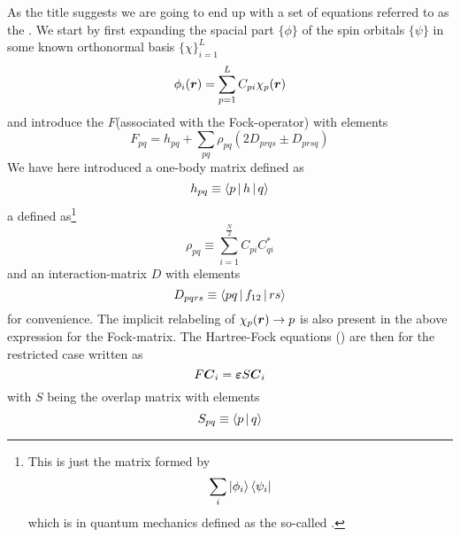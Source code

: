         As the title suggests we are going to end up with a set of equations
        referred to as the . We start by first
        expanding the spacial part $\{\phi\}$ of the spin orbitals $\{\psi\}$
        in some known orthonormal basis $\{\chi\}^L_{i=1}$
            \begin{equation}
                \phi_i(\boldsymbol{{r}}) = \sum\limits^L_{p=1} C_{pi}\chi_p(\boldsymbol{{r}})
            \end{equation}
        and introduce the  $F$(associated with the
        Fock-operator) with elements
            \begin{equation}
                F_{pq} = h_{pq} + \sum_{pq}\rho_{pq}\left(2D_{prqs} \pm
                D_{prsq}\right)
                \label{eq:FockRestrictedDef}
            \end{equation}
        We have here introduced a one-body matrix defined as
            \begin{equation}
                h_{pq} \equiv \Braket{p | h | q}
            \end{equation}
        a  defined
        as\footnote{This is just the matrix formed by \begin{equation}
        \sum_i\ket{\phi_i}\bra{\psi_i}\end{equation} which is in quantum
        mechanics defined as the so-called .}
            \begin{equation}
                \rho_{pq} \equiv \sum\limits^{\frac{N}{2}}_{i=1}
                C_{pi}C^{*}_{qi}
                \label{eq:densitymatrixdef}
            \end{equation}
        and an interaction-matrix $D$ with elements
            \begin{equation}
                D_{pqrs} \equiv \Braket{pq | f_{12} | rs}
            \end{equation}
        for convenience. The implicit relabeling of $\chi_p(\boldsymbol{{r}})\rightarrow p$
        is also present in the above expression for the Fock-matrix. The
        Hartree-Fock equations () are then for the
        restricted case written as
            \begin{equation}
                F\boldsymbol{{C}}_i = \boldsymbol{{\varepsilon}}S\boldsymbol{{C}}_i
                \label{eq:eigvalrestr}
            \end{equation}
        with $S$ being the overlap matrix with elements
            \begin{equation}
                S_{pq} \equiv \Braket{p | q}
            \end{equation}

